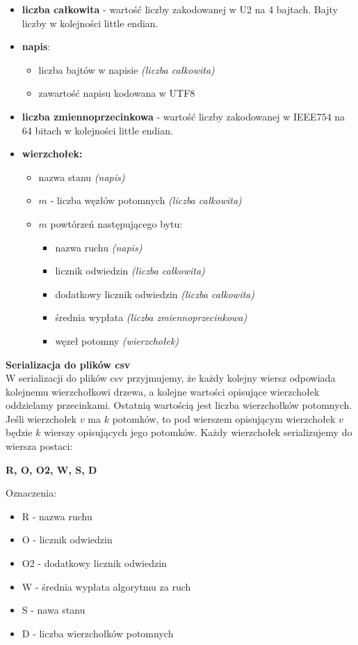 \documentclass{article}
\begin{document}
	\begin{itemize}
		\item \textbf{liczba całkowita} - wartość liczby zakodowanej w U2 na 4 bajtach. Bajty liczby w kolejności little endian.
		\item \textbf{napis}:
		\begin{itemize}
			\item liczba bajtów w napisie \textit{(liczba całkowita)}
			\item zawartość napisu kodowana w UTF8
		\end{itemize}
		\item \textbf{liczba zmiennoprzecinkowa} - wartość liczby zakodowanej w IEEE754 na 64 bitach w kolejności little endian.
		\item \textbf{wierzchołek:}
		\begin{itemize}
			\item nazwa stanu \textit{(napis)}
			\item $m$ - liczba węzłów potomnych \textit{(liczba całkowita)}
			\item $m$ powtórzeń następującego bytu:
			\begin{itemize}
				\item nazwa ruchu \textit{(napis)}
				\item licznik odwiedzin \textit{(liczba całkowita)}
				\item dodatkowy licznik odwiedzin \textit{(liczba całkowita)}
				\item średnia wypłata \textit{(liczba zmiennoprzecinkowa)}
				\item węzeł potomny \textit{(wierzchołek)} \\
			\end{itemize}
		\end{itemize}
	\end{itemize}
	
	
	\noindent \textbf{\large Serializacja do plików csv} \\
	W serializacji do plików csv przyjmujemy, że każdy kolejny wiersz odpowiada kolejnemu wierzchołkowi drzewa, a kolejne wartości opisujące wierzchołek oddzielamy przecinkami. Ostatnią wartością jest liczba wierzchołków potomnych. Jeśli wierzchołek $v$ ma $k$ potomków, to pod wierszem opisującym wierzchołek $v$ będzie $k$ wierszy opisujących jego potomków. Każdy wierzchołek serializujemy do wiersza postaci:
	\begin{center}
		\textbf{R, O, O2, W, S, D}
	\end{center}
	Oznaczenia:
	\begin{itemize}
		\item R - nazwa ruchu
		\item O - licznik odwiedzin
		\item O2 - dodatkowy licznik odwiedzin
		\item W - średnia wypłata algorytmu za ruch
		\item S - nawa stanu
		\item D - liczba wierzchołków potomnych
	\end{itemize}
\end{document}
